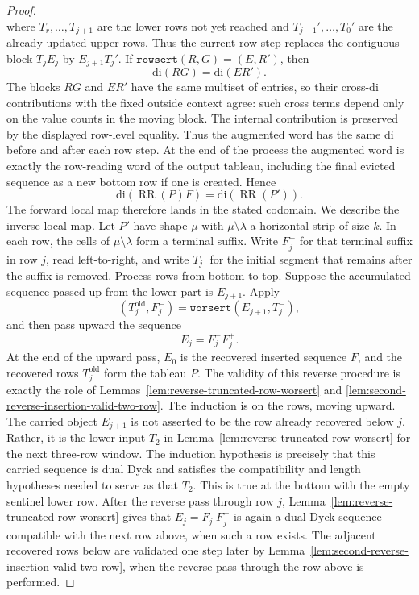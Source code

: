 \documentclass[10pt,a4paper]{amsart}
\newcommand{\di}{\mathrm{di}}
\newcommand{\rowsert}{\texttt{rowsert}}
\newcommand{\worsert}{\texttt{worsert}}
\begin{document}
\begin{proof}
\[\]
where \(T_r,\ldots,T_{j+1}\) are the lower rows not yet reached and
\(T_{j-1}',\ldots,T_0'\) are the already updated upper rows.  Thus the current
row step replaces the contiguous block \(T_jE_j\) by \(E_{j+1}T_j'\).  If
\(\rowsert(R,G)=(E,R')\), then
\[
  \di(RG)=\di(ER').
\]
The blocks \(RG\) and \(ER'\) have the same multiset of entries, so their
cross-\(\di\) contributions with the fixed outside context agree: such cross
terms depend only on the value counts in the moving block.  The internal
contribution is preserved by the displayed row-level equality.  Thus the
augmented word has the same \(\di\) before and after each row step.  At the end
of the process the augmented word is exactly the row-reading word of the output
tableau, including the final evicted sequence as a new bottom row if one is
created.  Hence
\[
  \di(\operatorname{RR}(P)F)=\di(\operatorname{RR}(P')).
\]
The forward local map therefore lands in the stated codomain.
We describe the inverse local map.  Let \(P'\) have shape \(\mu\) with
\(\mu\setminus\lambda\) a horizontal strip of size \(k\).  In each row, the
cells of \(\mu\setminus\lambda\) form a terminal suffix.  Write \(F_j^+\) for
that terminal suffix in row \(j\), read left-to-right, and write \(T_j^-\) for
the initial segment that remains after the suffix is removed.
Process rows from bottom to top.  Suppose the accumulated sequence passed up
from the lower part is \(E_{j+1}\).  Apply
\[
  (T_j^{\mathrm{old}},F_j^-)=\worsert(E_{j+1},T_j^-),
\]
and then pass upward the sequence
\[
  E_j=F_j^-F_j^+.
\]
At the end of the upward pass, \(E_0\) is the recovered inserted sequence
\(F\), and the recovered rows \(T_j^{\mathrm{old}}\) form the tableau \(P\).
The validity of this reverse procedure is exactly the role of
Lemmas~\ref{lem:reverse-truncated-row-worsert} and
\ref{lem:second-reverse-insertion-valid-two-row}.  The induction is on the
rows, moving upward.  The carried object \(E_{j+1}\) is not asserted to be the
row already recovered below \(j\).  Rather, it is the lower input \(T_2\) in
Lemma~\ref{lem:reverse-truncated-row-worsert} for the next three-row window.
The induction hypothesis is precisely that this carried sequence is dual Dyck
and satisfies the compatibility and length hypotheses needed to serve as that
\(T_2\).  This is true at the bottom with the empty sentinel lower row.
After the reverse pass through row \(j\), Lemma~\ref{lem:reverse-truncated-row-worsert}
gives that \(E_j=F_j^-F_j^+\) is again a dual Dyck sequence compatible with
the next row above, when such a row exists.  The adjacent recovered rows below
are validated one step later by Lemma~\ref{lem:second-reverse-insertion-valid-two-row},
when the reverse pass through the row above is performed.


\end{proof}
\end{document}
